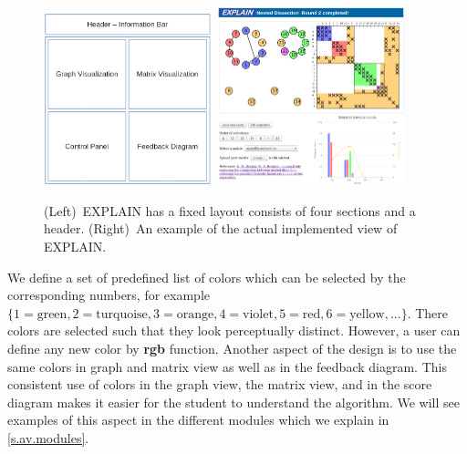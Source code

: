 \documentclass[12pt, twoside,a4paper,toc=bibliography]{scrbook}
\begin{document}
\begin{figure}
\centering
\includegraphics[width=0.44\textwidth]{explain-vis.png}
\hfill
\includegraphics[width=0.48\textwidth]{explain2-init.png}
\caption{
(Left)~\mbox{EXPLAIN} has a fixed layout consists of four sections and a header.
(Right)~An example of the actual implemented view of \mbox{EXPLAIN}.}
\label{explain-design}
\end{figure}

We define a set of predefined list of colors which can be selected by
the corresponding numbers, for example
$\{1=\text{green}, 2=\text{turquoise}, 3=\text{orange}, 4=\text{violet},
5=\text{red}, 6=\text{yellow}, ...\}$.
There colors are selected such that they look perceptually distinct.
However, a user can define any new color by \textbf{rgb} function.
Another aspect of the design is to use the same colors in graph and matrix view
as well as in the feedback diagram.
This consistent use of colors in the graph
view, the matrix view, and in the score diagram makes it easier for the student to understand
the algorithm. We will see examples of this aspect in the different modules
which we explain in \ref{s.av.modules}.
\end{document}
